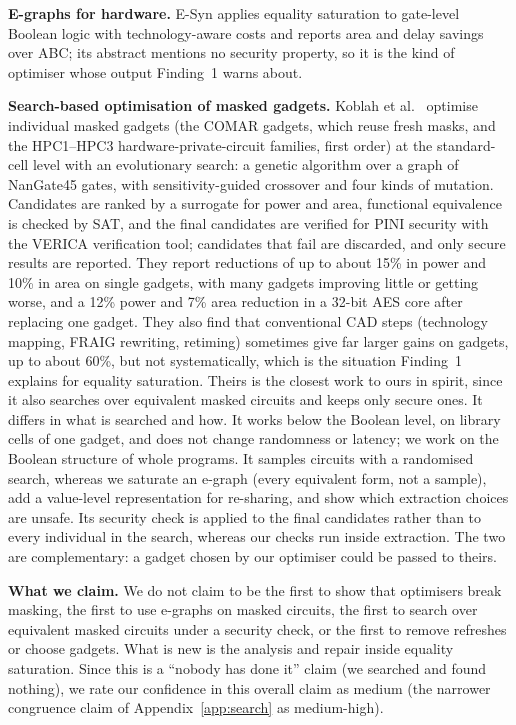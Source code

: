 \documentclass[conference]{IEEEtran}
\begin{document}
\textbf{E-graphs for hardware.} E-Syn \cite{chen2024esyn} applies equality saturation to gate-level Boolean logic with technology-aware costs and reports area and delay savings over ABC; its abstract mentions no security property, so it is the kind of optimiser whose output Finding~1 warns about.

\textbf{Search-based optimisation of masked gadgets.} Koblah et al.\ \cite{koblah2025evo} optimise individual masked gadgets (the COMAR gadgets, which reuse fresh masks, and the HPC1--HPC3 hardware-private-circuit families, first order) at the standard-cell level with an evolutionary search: a genetic algorithm over a graph of NanGate45 gates, with sensitivity-guided crossover and four kinds of mutation. Candidates are ranked by a surrogate for power and area, functional equivalence is checked by SAT, and the final candidates are verified for PINI security with the VERICA verification tool; candidates that fail are discarded, and only secure results are reported. They report reductions of up to about 15\% in power and 10\% in area on single gadgets, with many gadgets improving little or getting worse, and a 12\% power and 7\% area reduction in a 32-bit AES core after replacing one gadget. They also find that conventional CAD steps (technology mapping, FRAIG rewriting, retiming) sometimes give far larger gains on gadgets, up to about 60\%, but not systematically, which is the situation Finding~1 explains for equality saturation. Theirs is the closest work to ours in spirit, since it also searches over equivalent masked circuits and keeps only secure ones. It differs in what is searched and how. It works below the Boolean level, on library cells of one gadget, and does not change randomness or latency; we work on the Boolean structure of whole programs. It samples circuits with a randomised search, whereas we saturate an e-graph (every equivalent form, not a sample), add a value-level representation for re-sharing, and show which extraction choices are unsafe. Its security check is applied to the final candidates rather than to every individual in the search, whereas our checks run inside extraction. The two are complementary: a gadget chosen by our optimiser could be passed to theirs.

\textbf{What we claim.} We do not claim to be the first to show that optimisers break masking, the first to use e-graphs on masked circuits, the first to search over equivalent masked circuits under a security check, or the first to remove refreshes or choose gadgets. What is new is the analysis and repair inside equality saturation. Since this is a ``nobody has done it'' claim (we searched and found nothing), we rate our confidence in this overall claim as medium (the narrower congruence claim of Appendix~\ref{app:search} as medium-high).
\end{document}
